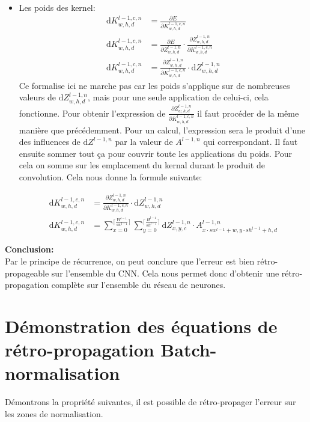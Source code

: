 \documentclass[12pt,a4paper]{extarticle}
\newcommand{\ud}{\mathrm{d}}
\begin{document}
\begin{itemize}
\item Les poids des kernel:\\
\begin{align}
\ud K^{l-1,c,n}_{w,h,d} &= \frac{\partial E}{\partial K^{l-1,c,n}_{w,h,d}} \\
		\ud K^{l-1,c,n}_{w,h,d}&=\frac{\partial E}{\partial Z^{l-1,n}_{w,h,d}}\cdot \frac{\partial Z^{l-1,n}_{w,h,d}}{\partial K^{l-1,c,n}_{w,h,d}} \\
		\ud K^{l-1,c,n}_{w,h,d}&=\frac{\partial Z^{l-1,n}_{w,h,d}}{\partial K^{l-1,c,n}_{w,h,d}} \cdot \ud Z^{l-1,n}_{w,h,d}
\end{align}
Ce formalise ici ne marche pas car les poids s'applique sur de nombreuses valeurs de $\ud Z^{l-1,n}_{w,h,d}$, mais pour une seule application de celui-ci, cela fonctionne. 
Pour obtenir l'expression de $\frac{\partial Z^{l-1,n}_{w,h,d}}{\partial K^{l-1,c,n}_{w,h,d}}$ il faut procéder de la même manière que précédemment. Pour un calcul, l'expression sera le produit d'une des influences de $\ud Z^{l-1,n}$ par la valeur de $A^{l-1,n}$ qui correspondant. Il faut ensuite sommer tout ça pour couvrir toute les applications du poids. Pour cela on somme sur les emplacement du kernal durant le produit de convolution. Cela nous donne la formule suivante:


\begin{align}
	\ud K^{l-1,c,n}_{w,h,d}&=\frac{\partial Z^{l-1,n}_{w,h,d}}{\partial K^{l-1,c,n}_{w,h,d}} \cdot \ud Z^{l-1,n}_{w,h,d} \\
	\ud K^{l-1,c,n}_{w,h,d} &= \sum_{x=0}^{ \lceil \frac{W^{l-1}}{sw^{l-1}} \rceil} \sum_{y=0}^{\lceil \frac{H^{l-1}}{sh^{l-1}}\rceil }\ud Z^{l-1,n}_{x,y,c}\cdot A^{l-1,n}_{x\cdot sw^{l-1}+w, y\cdot sh^{l-1}+h, d}	
\end{align}
\end{itemize}
\textbf{Conclusion:} \\
\indent Par le principe de récurrence, on peut conclure que l'erreur est bien rétro-propageable sur l'ensemble du CNN. Cela nous permet donc d'obtenir une rétro-propagation complète sur l'ensemble du réseau de neurones. 
\newpage
\section{Démonstration des équations de rétro-propagation  Batch-normalisation} 

Démontrons la propriété suivantes, il est possible de rétro-propager l'erreur sur les zones de normalisation.\\
\end{document}
